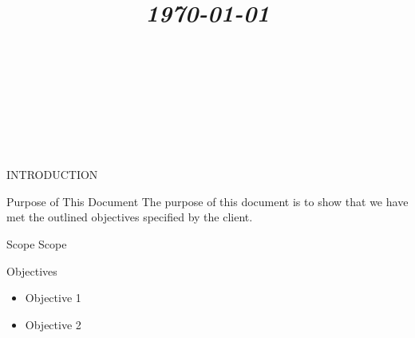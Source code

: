 \documentclass{article}
\title{
	\vspace{1.2in}
	\textmd{\textbf{\doctitle}} \\
	\vspace{0.1in}\large{\textit{\today}} \\
	\vspace{0.4in}
	{\bf{\qanumber}} \\ \vspace{0.4in}
	\version \\
	\status \\
	\vspace{0.4in}
}
\author{\authors}
\date{}
\begin{document}
	\maketitle
	\newpage
	\tableofcontents
	\newpage

	\begin{section}{INTRODUCTION}
		\begin{subsection}{Purpose of This Document}
			The purpose of this document is to show that we have met the outlined objectives specified by the client.
		\end{subsection}
	
		\begin{subsection}{Scope}
			Scope
		\end{subsection}
		
		\begin{subsection}{Objectives}
			\begin{itemize}
				\item{Objective 1}
				\item{Objective 2}
			\end{itemize}
		\end{subsection}
	\end{section}
	
\end{document}
